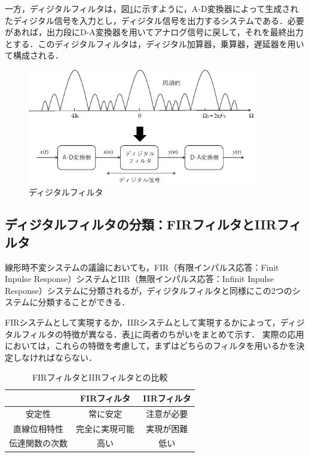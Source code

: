 一方，ディジタルフィルタは，図\ref{fig:zu-6-2}に示すように，A-D変換器によって生成されたディジタル信号を入力とし，ディジタル信号を出力するシステムである．必要があれば，出力段にD-A変換器を用いてアナログ信号に戻して，それを最終出力とする．このディジタルフィルタは，ディジタル加算器，乗算器，遅延器を用いて構成される．

\begin{figure}[H]
\begin{center}
\includegraphics[width=10cm]{fig/zu-6-2.eps}
\end{center}
\caption{ディジタルフィルタ}
\label{fig:zu-6-2}
\end{figure}

\subsection{ディジタルフィルタの分類：FIRフィルタとIIRフィルタ}


線形時不変システムの議論においても，FIR（有限インパルス応答：Finit Inpulse Response）システムとIIR（無限インパルス応答：Infinit Inpulse Response）システムに分類されるが，ディジタルフィルタと同様にこの2つのシステムに分類することができる．

FIRシステムとして実現するか，IIRシステムとして実現するかによって，ディジタルフィルタの特徴が異なる．表\ref{table-6-1}に両者のちがいをまとめて示す．
実際の応用においては，これらの特徴を考慮して，まずはどちらのフィルタを用いるかを決定しなければならない．

\begin{table}
\caption{FIRフィルタとIIRフィルタとの比較}\label{table-6-1}
\begin{center}
\begin{tabular}{|c|c|c|}
\hline
 & FIRフィルタ & IIRフィルタ \\
\hline
安定性 & 常に安定 & 注意が必要 \\
\hline
直線位相特性 & 完全に実現可能 & 実現が困難 \\
\hline
伝達関数の次数 & 高い & 低い \\
\hline
\end{tabular}
\end{center}
\end{table}


